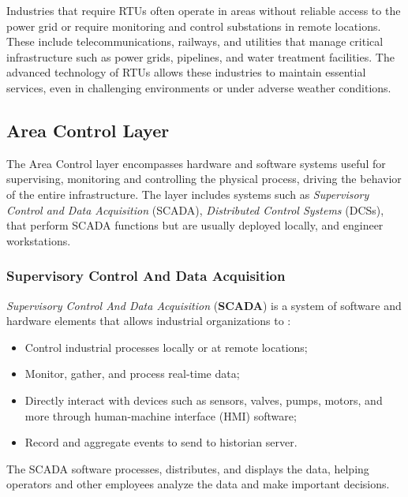 \bigskip
Industries that require RTUs often operate in areas without reliable access to the power grid or require monitoring and control substations in remote locations. These include telecommunications, railways, and utilities that manage critical infrastructure such as power grids, pipelines, and water treatment facilities. The advanced technology of RTUs allows these industries to maintain essential services, even in challenging environments or under adverse weather conditions.

\subsection{Area Control Layer}
\label{subsec:2_ot_control_system}
The Area Control layer encompasses hardware and software systems useful for supervising, monitoring and controlling the physical process, driving the behavior of the entire infrastructure. The layer includes systems such as \textit{Supervisory Control and Data Acquisition} (SCADA), \textit{Distributed Control Systems} (DCSs), that perform SCADA functions but are usually deployed locally, and engineer workstations.

\subsubsection{Supervisory Control And Data Acquisition}
\label{subsubsec:2_scada}

\textit{Supervisory Control And Data Acquisition} (\textbf{SCADA}) is a system of software and hardware elements that allows industrial organizations to \cite{scada_definition}:
\begin{itemize}
	\item Control industrial processes locally or at remote locations;
	\item Monitor, gather, and process real-time data;
	\item Directly interact with devices such as sensors, valves, pumps, motors, and more through human-machine interface (HMI) software;
	\item Record and aggregate events to send to historian server.
\end{itemize}
The SCADA software processes, distributes, and displays the data, helping operators and other employees analyze the data and make important decisions.

